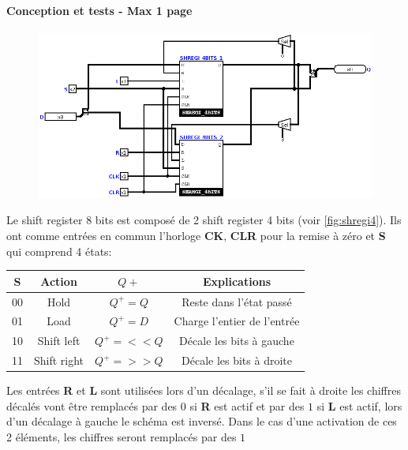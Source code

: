 \documentclass[a4paper]{article} %
\begin{document}
\begin{tcolorbox}[colframe=Monokaimagenta,colback=white]
\paragraph{Conception et tests - Max 1 page}
\begin{figure}[H]
    \centering
    \includegraphics[width=.8\textwidth]{src/SHREGI_8BITS.png}
    \label{fig:SHREGI_8}
\end{figure}

Le shift register 8 bits est composé de 2 shift register 4 bits (voir \ref{fig:shregi4}).  Ils ont comme entrées en commun l'horloge \textbf{CK}, \textbf{CLR} pour la remise à zéro et \textbf{S} qui comprend 4 états: 

\begin{center}
    \begin{tabular}{|c|c|c|c|}
        \hline
        S  & Action      & $Q+$        & Explications\\
        \hline
        00 & Hold        & $Q^+ = Q$   & Reste dans l'état passé \\
        01 & Load        & $Q^+ = D$   & Charge l'entier de l'entrée \\
        10 & Shift left  & $Q^+ = <<Q$ & Décale les bits à gauche \\
        11 & Shift right & $Q^+ = >>Q$ & Décale les bits à droite \\
        \hline    
    \end{tabular}    
\end{center}

Les entrées \textbf{R} et \textbf{L} sont utilisées lors d'un décalage, s'il se fait à droite les chiffres décalés vont être remplacés par des $0$ si \textbf{R} est actif et par des $1$ si \textbf{L} est actif, lors d'un décalage à gauche le schéma est inversé. Dans le cas d'une activation de ces 2 éléments, les chiffres seront remplacés par des $1$\\


\end{tcolorbox}
\end{document}

